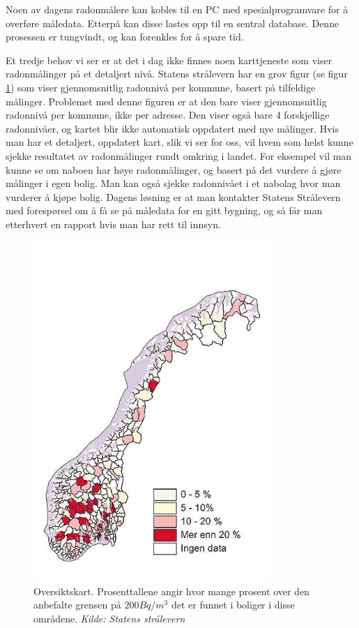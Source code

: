 Noen av dagens radonmålere kan kobles til en PC med spesialprogramvare for å overføre måledata. Etterpå kan disse lastes opp til en sentral database. Denne prosessen er tungvindt, og kan forenkles for å spare tid.


Et tredje behov vi ser er at det i dag ikke finnes noen karttjeneste som viser radonmålinger på et detaljert nivå. Statens strålevern har en grov figur (se figur \ref{fig:oversiktskart}) som viser gjennomsnitlig radonnivå per kommune, basert på tilfeldige målinger. Problemet med denne figuren er at den bare viser gjennomsnitlig radonnivå per kommune, ikke per adresse. Den viser også bare 4 forskjellige radonnivåer, og kartet blir ikke automatisk oppdatert med nye målinger. Hvis man har et detaljert, oppdatert kart, slik vi ser for oss, vil hvem som helst kunne sjekke resultatet av radonmålinger rundt omkring i landet. For eksempel vil man kunne se om naboen har høye radonmålinger, og basert på det vurdere å gjøre målinger i egen bolig. Man kan også sjekke radonnivået i et nabolag hvor man vurderer å kjøpe bolig. Dagens løsning er at man kontakter Statens Strålevern med forespørsel om å få se på måledata for en gitt bygning, og så får man etterhvert en rapport hvis man har rett til innsyn.

\begin{figure}[ht!]
\centering
\includegraphics[width=90mm]{straleskart.jpg}
\caption{Oversiktskart. Prosenttallene angir hvor mange prosent over den anbefalte grensen på $200Bq/m^3$ det er funnet i boliger i disse områdene.
\textit{Kilde: Statens strålevern}
}
\label{fig:oversiktskart}
\end{figure}


